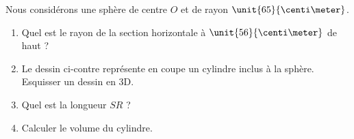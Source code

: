 
\begin{exercice}\label{exosmath-0094}

\begin{wrapfigure}{r}{0.2\textwidth}
    \centering
    \vspace{-0.5cm}

\end{wrapfigure}

    Nous considérons une sphère de centre \( O\) et de rayon \( \unit{65}{\centi\meter}\).
        \begin{enumerate}
            \item
                Quel est le rayon de la section horizontale à \( \unit{56}{\centi\meter}\) de haut ?
            \item
                Le dessin ci-contre représente en coupe un cylindre inclus à la sphère. Esquisser un dessin en 3D.
            \item
                Quel est la longueur \( SR\) ?
            \item
                Calculer le volume du cylindre.
        \end{enumerate}

%

\end{exercice}
